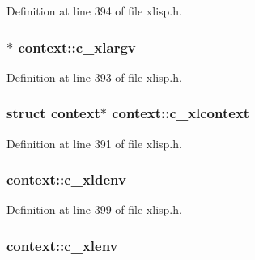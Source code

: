 Definition at line 394 of file xlisp.\+h.

\subsubsection[{\texorpdfstring{c\+\_\+xlargv}{c_xlargv}}]{$\ast$ context\+::c\+\_\+xlargv}\hypertarget{structcontext_aaf337a658ba4dc5c21a1824c5e77ada4}{}\label{structcontext_aaf337a658ba4dc5c21a1824c5e77ada4}


Definition at line 393 of file xlisp.\+h.

\subsubsection[{\texorpdfstring{c\+\_\+xlcontext}{c_xlcontext}}]{\setlength{\rightskip}{0pt plus 5cm}struct {\bf context}$\ast$ context\+::c\+\_\+xlcontext}\hypertarget{structcontext_ab875672af9513f4f5a59613c352ab807}{}\label{structcontext_ab875672af9513f4f5a59613c352ab807}


Definition at line 391 of file xlisp.\+h.

\subsubsection[{\texorpdfstring{c\+\_\+xldenv}{c_xldenv}}]{ context\+::c\+\_\+xldenv}\hypertarget{structcontext_a118951781a108d36b70642d908f3e767}{}\label{structcontext_a118951781a108d36b70642d908f3e767}


Definition at line 399 of file xlisp.\+h.

\subsubsection[{\texorpdfstring{c\+\_\+xlenv}{c_xlenv}}]{ context\+::c\+\_\+xlenv}\hypertarget{structcontext_a2e72d4b066ac227fbc5b58143d9263f4}{}\label{structcontext_a2e72d4b066ac227fbc5b58143d9263f4}


